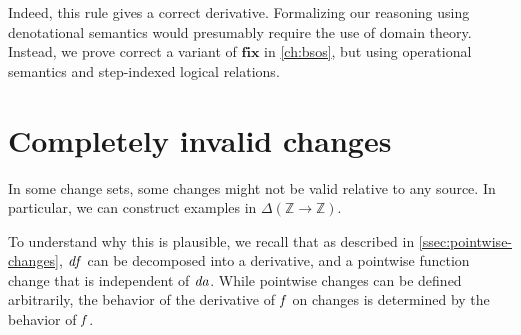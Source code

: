 Indeed, this rule gives a correct derivative.
Formalizing our reasoning using denotational semantics would presumably require
the use of domain theory.
Instead, we prove correct a variant of \ensuremath{\mathbf{fix}} in \cref{ch:bsos}, but using
operational semantics and step-indexed logical relations.




\section{Completely invalid changes}
\label{sec:very-invalid}
In some change sets, some changes might not be valid relative to
any source. In particular, we can construct examples in \ensuremath{\Delta (\mathbb{Z}\to \mathbb{Z})}.

To understand why this is plausible, we recall that as described
in \cref{ssec:pointwise-changes}, \ensuremath{\Varid{df}} can be decomposed into a
derivative, and a pointwise function change that is independent
of \ensuremath{\Varid{da}}. While pointwise changes can be defined arbitrarily, the
behavior of the derivative of \ensuremath{\Varid{f}} on changes is determined by the
behavior of \ensuremath{\Varid{f}}.

